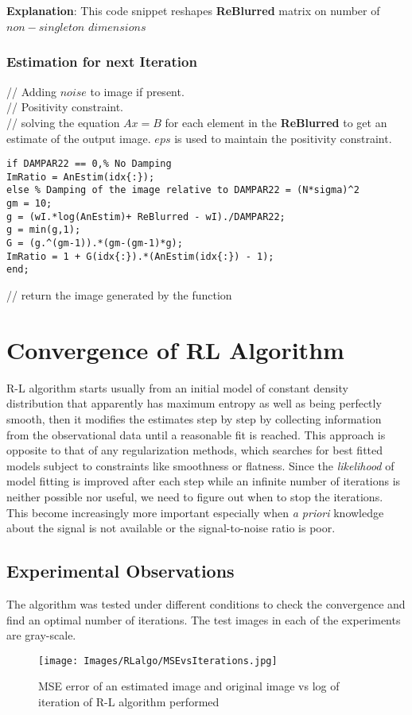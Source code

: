 \documentclass[a4paper]{book}
\begin{document}
\subparagraph*{}\textbf{\small Explanation}: This code snippet reshapes \textbf{\small ReBlurred} matrix on number of $ non-singleton$ $dimensions$ 
\

\subsubsection{Estimation for next Iteration}
 // Adding $ noise $ to image if present. \\
 // Positivity constraint. \\
 // solving the equation $ Ax=B  $ for each element in the \textbf{\small ReBlurred} to get an estimate of the output image. $ eps $ is used to maintain the positivity constraint.
\begin{lstlisting}
if DAMPAR22 == 0,% No Damping
ImRatio = AnEstim(idx{:});
else % Damping of the image relative to DAMPAR22 = (N*sigma)^2
gm = 10;
g = (wI.*log(AnEstim)+ ReBlurred - wI)./DAMPAR22;
g = min(g,1);
G = (g.^(gm-1)).*(gm-(gm-1)*g);
ImRatio = 1 + G(idx{:}).*(AnEstim(idx{:}) - 1);
end;
\end{lstlisting}
\bigskip
{} // return the image generated by the function



\section{\Large Convergence of RL Algorithm}
R-L algorithm starts usually from an initial model of constant density distribution that apparently has maximum entropy as well as being perfectly smooth, then it modifies the estimates step by step by collecting information from the observational data until a reasonable fit is reached. This approach is opposite to that of any regularization methods, which searches for best fitted models subject to constraints like smoothness or flatness.
Since the \textit{likelihood} of model fitting is improved after each step while an infinite number of iterations is neither possible nor useful, we need to figure out when to stop the iterations. This become increasingly more important especially when \textit{a priori} knowledge about the signal is not available or the signal-to-noise ratio is poor.
\newpage	
\subsection[Experiments]{Experimental Observations}
The algorithm was tested under different conditions to check the convergence and find an optimal number of iterations. The test images in each of the experiments are gray-scale. 
\begin{figure}[H]
	\texttt{[image: Images/RLalgo/MSEvsIterations.jpg]}
	\caption{MSE error of an estimated image and original image vs log of iteration of R-L algorithm performed }
	\label{MSE1}
\end{figure}
\end{document}
